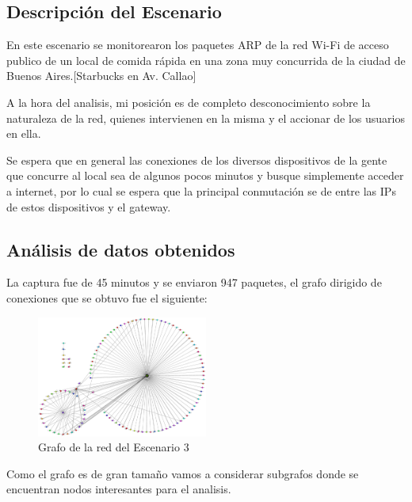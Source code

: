 \subsection{Descripci\'on del Escenario}
	\par En este escenario se monitorearon los paquetes ARP de la red Wi-Fi de acceso publico de un local de comida rápida en una zona muy concurrida de la ciudad de Buenos Aires.[Starbucks en Av. Callao]

	\par A la hora del analisis, mi posición es de completo desconocimiento sobre la naturaleza de la red, quienes intervienen en la misma y el accionar de los usuarios en ella.
    
	\par Se espera que en general las conexiones de los diversos dispositivos de la gente que concurre al local sea de algunos pocos minutos y busque simplemente acceder a internet, por lo cual se espera que la principal conmutación se de entre las IPs de estos dispositivos y el gateway.



\subsection{An\'alisis de datos obtenidos}
	\par La captura fue de 45 minutos y se enviaron 947 paquetes, el grafo dirigido de conexiones que se obtuvo fue el siguiente:

 
 \begin{figure}[H]
		\centering
		\includegraphics[width=0.5\textwidth]{img/graph/escenario_3/starbucks2.eps}
		\caption{Grafo de la red del Escenario 3}
		\label{fig:grafo_escenario3}
	\end{figure}

	\par Como el grafo es de gran tamaño vamos a considerar subgrafos donde se encuentran nodos interesantes para el analisis.

